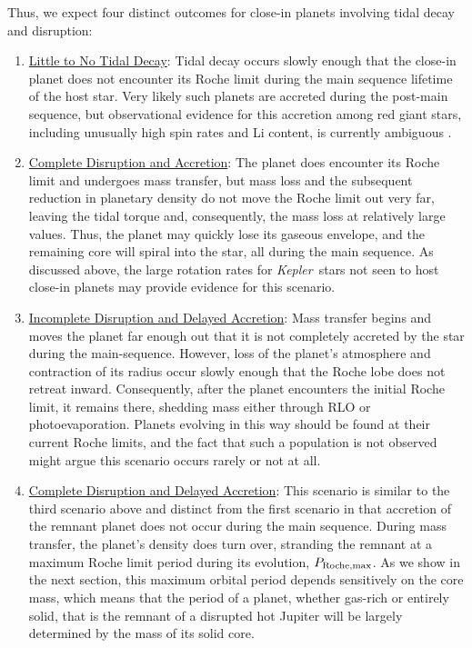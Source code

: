 \documentclass{svjour3}                     %
\newcommand{\kepler}{\emph{Kepler}}
\begin{document}
Thus, we expect four distinct outcomes for close-in planets involving tidal decay and disruption:
 \begin{enumerate} 
\item \underline{Little to No Tidal Decay}: Tidal decay occurs slowly enough that the close-in planet does not encounter its Roche limit during the main sequence lifetime of the host star. Very likely such planets are accreted during the post-main sequence, but observational evidence for this accretion among red giant stars, including unusually high spin rates and Li content, is currently ambiguous \cite{2012ApJ...757..109C}.

\item \underline{Complete Disruption and Accretion}: The planet does encounter its Roche limit and undergoes mass transfer, but mass loss and the subsequent reduction in planetary density do not move the Roche limit out very far, leaving the tidal torque and, consequently, the mass loss at relatively large values. Thus, the planet may quickly lose its gaseous envelope, and the remaining core will spiral into the star, all during the main sequence. As discussed above, the large rotation rates for \kepler\ stars not seen to host close-in planets \cite{2013ApJ...775L..11M} may provide evidence for this scenario.

\item \underline{Incomplete Disruption and Delayed Accretion}: Mass transfer begins and moves the planet far enough out that it is not completely accreted by the star during the main-sequence. However, loss of the planet's atmosphere and contraction of its radius occur slowly enough that the Roche lobe does not retreat inward. Consequently, after the planet encounters the initial Roche limit, it remains there, shedding mass either through RLO or photoevaporation. Planets evolving in this way should be found at their current Roche limits, and the fact that such a population is not observed might argue this scenario occurs rarely or not at all.

\item \underline{Complete Disruption and Delayed Accretion}: This scenario is similar to the third scenario above and distinct from the first scenario in that accretion of the remnant planet does not occur during the main sequence. During mass transfer, the planet's density does turn over, stranding the remnant at a maximum Roche limit period during its evolution, $P_{\rm Roche, max}$. As we show in the next section, this maximum orbital period depends sensitively on the core mass, which means that the period of a planet, whether gas-rich or entirely solid, that is the remnant of a disrupted hot Jupiter will be largely determined by the mass of its solid core. 

 \end{enumerate} 
\end{document}
